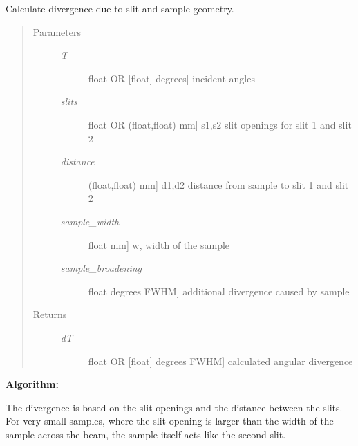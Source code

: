\documentclass[letterpaper,10pt,english]{sphinxmanual}
\begin{document}
\begin{fulllineitems}
\label{api/resolution:refl1d.resolution.divergence}
Calculate divergence due to slit and sample geometry.
\begin{quote}\begin{description}
\item[{Parameters }] \leavevmode\begin{description}
\item[{\emph{T}}] \leavevmode{[}float OR {[}float{]} \textbar{} degrees{]}
incident angles

\item[{\emph{slits}}] \leavevmode{[}float OR (float,float) \textbar{} mm{]}
s1,s2 slit openings for slit 1 and slit 2

\item[{\emph{distance}}] \leavevmode{[}(float,float) \textbar{} mm{]}
d1,d2 distance from sample to slit 1 and slit 2

\item[{\emph{sample\_width}}] \leavevmode{[}float \textbar{} mm{]}
w, width of the sample

\item[{\emph{sample\_broadening}}] \leavevmode{[}float \textbar{} degrees FWHM{]}
additional divergence caused by sample

\end{description}

\item[{Returns }] \leavevmode\begin{description}
\item[{\emph{dT}}] \leavevmode{[}float OR {[}float{]} \textbar{} degrees FWHM{]}
calculated angular divergence

\end{description}

\end{description}\end{quote}

\textbf{Algorithm:}

The divergence is based on the slit openings and the distance between
the slits.  For very small samples, where the slit opening is larger
than the width of the sample across the beam, the sample itself acts
like the second slit.


\end{fulllineitems}
\end{document}
